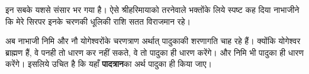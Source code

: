 \begin{sloppypar}\justifying{}
इन सबके यशसे संसार भर गया है। ऐसे श्रीहरिमायाको तरनेवाले भक्तोंके लिये स्पष्ट कह दिया नाभाजीने कि मेरे सिरपर इनके चरणकी धूलिकी राशि सतत विराजमान रहे।
\end{sloppypar}
\begin{sloppypar}\justifying{}
अब नाभाजी निमि और नौ योगेश्वरोंके चरणत्राण अर्थात् पादुकाकी शरणागति चाह रहे हैं। क्योंकि योगेश्वर ब्राह्मण हैं, वे पनही तो धारण कर नहीं सकते, वे तो पादुका ही धारण करेंगे। और निमि भी पादुका ही धारण करेंगे। इसलिये उचित है कि यहाँ \textbf{पादत्रान}का अर्थ पादुका ही किया जाए।
\end{sloppypar}


